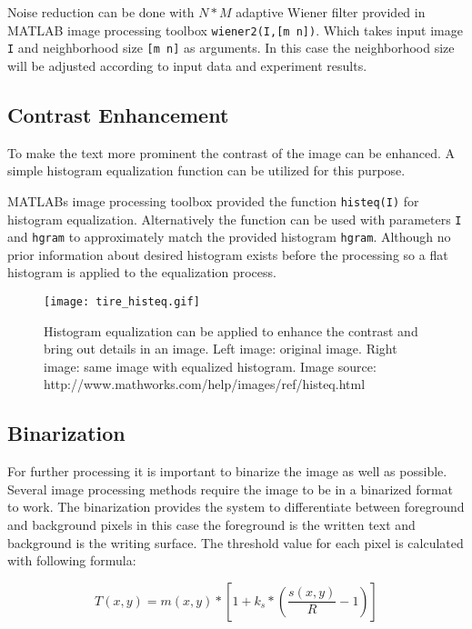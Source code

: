 \documentclass{article}
\def\code#1{\texttt{#1}}
\begin{document}
          Noise reduction can be done with $N * M$ adaptive Wiener filter provided in MATLAB image processing toolbox \code{wiener2(I,[m n])}. Which takes input image \code{I} and neighborhood size \code{[m n]} as arguments. In this case the neighborhood size will be adjusted according to input data and experiment results.

        \subsection{Contrast Enhancement}
          To make the text more prominent the contrast of the image can be enhanced. A simple histogram equalization function can be utilized for this purpose.

          MATLABs image processing toolbox provided the function \code{histeq(I)} for histogram equalization. Alternatively the function can be used with parameters \code{I} and \code{hgram} to approximately match the provided histogram \code{hgram}. Although no prior information about desired histogram exists before the processing so a flat histogram is applied to the equalization process.

          \begin{figure}[!ht]
            \centering
            \texttt{[image: tire\_histeq.gif]}
            \caption{Histogram equalization can be applied to enhance the contrast and bring out details in an image. Left image: original image. Right image: same image with equalized histogram. Image source: http://www.mathworks.com/help/images/ref/histeq.html \label{fig:histeq} }
          \end{figure}

        \subsection{Binarization}
          For further processing it is important to binarize the image as well as possible. Several image processing methods require the image to be in a binarized format to work. The binarization provides the system to differentiate between foreground and background pixels in this case the foreground is the written text and background is the writing surface. The threshold value for each pixel is calculated with following formula:

          \begin{equation}
            T(x,y) = m(x,y)*\left[1+k_s*\left(\frac{s(x,y)}{R}-1\right)\right]
          \end{equation}
\end{document}
